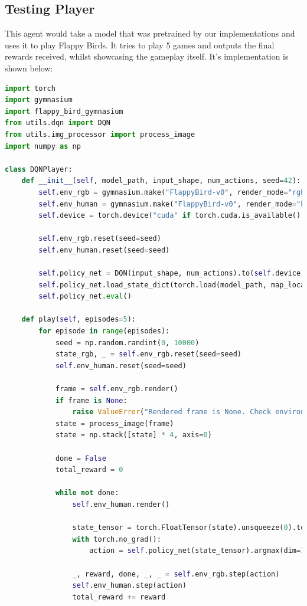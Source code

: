 \documentclass[a4paper,12pt]{article}
\begin{document}
\subsection{Testing Player}
This agent would take a model that was pretrained by our implementations and uses it to play Flappy Birds. It tries to play 5 games and outputs the final rewards received,
whilst showcasing the gameplay itself. It's implementation is shown below:
\begin{lstlisting}[language=Python, caption=Testing player]
import torch
import gymnasium
import flappy_bird_gymnasium
from utils.dqn import DQN
from utils.img_processor import process_image
import numpy as np

class DQNPlayer:
    def __init__(self, model_path, input_shape, num_actions, seed=42):
        self.env_rgb = gymnasium.make("FlappyBird-v0", render_mode="rgb_array",use_lidar = False)
        self.env_human = gymnasium.make("FlappyBird-v0", render_mode="human",use_lidar = False)
        self.device = torch.device("cuda" if torch.cuda.is_available() else "cpu")

        self.env_rgb.reset(seed=seed)
        self.env_human.reset(seed=seed)

        self.policy_net = DQN(input_shape, num_actions).to(self.device)
        self.policy_net.load_state_dict(torch.load(model_path, map_location=self.device))
        self.policy_net.eval()  

    def play(self, episodes=5):
        for episode in range(episodes):
            seed = np.random.randint(0, 10000)  
            state_rgb, _ = self.env_rgb.reset(seed=seed)
            self.env_human.reset(seed=seed)  

            frame = self.env_rgb.render()  
            if frame is None:
                raise ValueError("Rendered frame is None. Check environment's render_mode.")
            state = process_image(frame)
            state = np.stack([state] * 4, axis=0)  

            done = False
            total_reward = 0

            while not done:
                self.env_human.render()

                state_tensor = torch.FloatTensor(state).unsqueeze(0).to(self.device)
                with torch.no_grad():
                    action = self.policy_net(state_tensor).argmax(dim=1).item()

                _, reward, done, _, _ = self.env_rgb.step(action)
                self.env_human.step(action) 
                total_reward += reward
    

\end{lstlisting}
\end{document}
